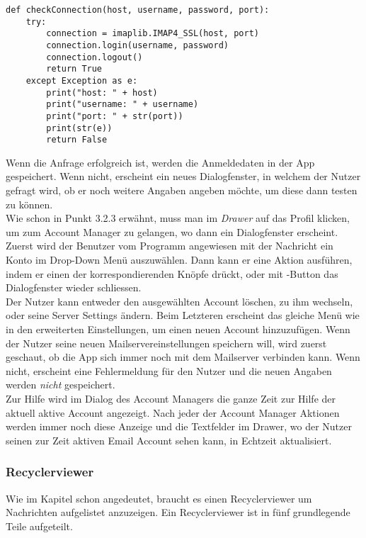 \documentclass[a4paper,11pt]{article}
\begin{document}
\lstset{language=python}
\begin{lstlisting}
def checkConnection(host, username, password, port):
    try:
        connection = imaplib.IMAP4_SSL(host, port)
        connection.login(username, password)
        connection.logout()
        return True
    except Exception as e:
        print("host: " + host)
        print("username: " + username)
        print("port: " + str(port))
        print(str(e))
        return False

\end{lstlisting}

Wenn die Anfrage erfolgreich ist, werden die Anmeldedaten in der App gespeichert. Wenn nicht, erscheint ein neues Dialogfenster, in welchem der Nutzer gefragt wird, ob er noch weitere Angaben angeben möchte, um diese dann testen zu können.\\

Wie schon in Punkt 3.2.3 erwähnt, muss man im \textit{Drawer} auf das Profil klicken, um zum Account Manager zu gelangen, wo dann ein Dialogfenster erscheint. Zuerst wird der Benutzer vom Programm angewiesen mit der Nachricht  ein Konto im Drop-Down Menü auszuwählen. Dann kann er eine Aktion ausführen, indem er einen der korrespondierenden Knöpfe drückt, oder mit -Button das Dialogfenster wieder schliessen.\\


Der Nutzer kann entweder den ausgewählten Account löschen, zu ihm wechseln, oder seine Server Settings ändern. Beim Letzteren erscheint das gleiche Menü wie in den erweiterten Einstellungen, um einen neuen Account hinzuzufügen. Wenn der Nutzer seine neuen Mailservereinstellungen speichern will, wird zuerst geschaut, ob die App sich immer noch mit dem Mailserver verbinden kann. Wenn nicht, erscheint eine Fehlermeldung für den Nutzer und die neuen Angaben werden \textit{nicht} gespeichert.\\

Zur Hilfe wird im Dialog des Account Managers die ganze Zeit zur Hilfe der aktuell aktive Account angezeigt. Nach jeder der Account Manager Aktionen werden immer noch diese Anzeige und die Textfelder im Drawer, wo der Nutzer seinen zur Zeit aktiven Email Account sehen kann, in Echtzeit aktualisiert.


\subsubsection{Recyclerviewer}
Wie im Kapitel  schon angedeutet, braucht es einen Recyclerviewer um Nachrichten aufgelistet anzuzeigen.
Ein Recyclerviewer ist in fünf grundlegende Teile aufgeteilt. 
\end{document}

